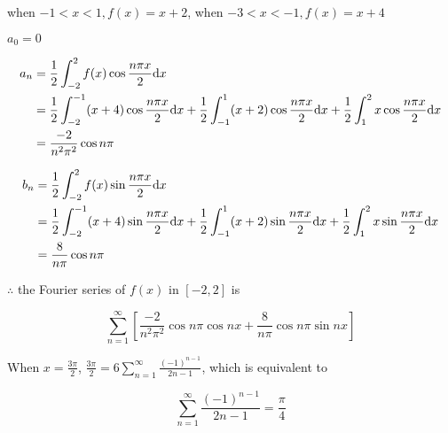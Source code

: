 \documentclass{article}
\begin{document}
    when $-1 < x < 1, f(x) = x + 2$, when $-3 < x < -1, f(x) = x + 4$

    $a_0 = 0$

    $$\begin{aligned}
        a_n &= \frac 1 2 \int_{-2}^2 f(x) \cos \frac{n\pi x}{2} \textrm dx \\
        &= \frac 1 2 \int_{-2}^{-1}(x + 4) \cos \frac{n\pi x}{2} \textrm dx + \frac 1 2 \int_{-1}^1 (x + 2) \cos \frac{n\pi x}{2} \textrm dx + \frac 1 2 \int_1^2 x \cos \frac{n\pi x}{2} \textrm dx \\
        &= \frac{-2}{n^2\pi^2} \cos n\pi
    \end{aligned}$$

    $$\begin{aligned}
        b_n &= \frac 1 2 \int_{-2}^2 f(x) \sin \frac{n\pi x}{2} \textrm dx \\
        &= \frac 1 2 \int_{-2}^{-1}(x + 4) \sin \frac{n\pi x}{2} \textrm dx + \frac 1 2 \int_{-1}^1 (x + 2) \sin \frac{n\pi x}{2} \textrm dx + \frac 1 2 \int_1^2 x \sin \frac{n\pi x}{2} \textrm dx \\
        &= \frac{8}{n\pi}\cos n \pi
    \end{aligned}$$

    $\therefore$ the Fourier series of $f(x)$ in $[-2, 2]$ is 
    
    $$\sum_{n=1}^\infty [\frac{-2}{n^2\pi^2} \cos n\pi \cos nx + \frac{8}{n\pi}\cos n \pi \sin nx]$$

    When $x = \frac{3\pi}{2}$, $\frac{3\pi}{2} = 6\sum_{n=1}^\infty \frac{(-1)^{n-1}}{2n-1}$, which is equivalent to 

    $$\sum_{n=1}^\infty \frac{(-1)^{n-1}}{2n-1} = \frac \pi 4$$
\end{document}
